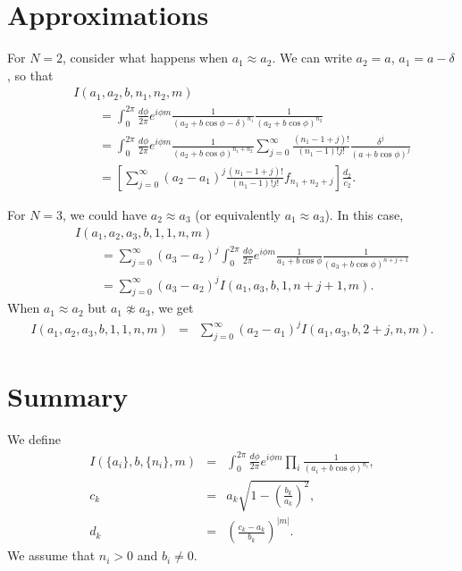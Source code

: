 \documentclass[aps,prc,preprint,tightenlines]{revtex4}
\begin{document}
\section*{Approximations}

For $N=2$, consider what happens when $a_1 \approx a_2$. We can write
$a_2 = a$, $a_1 = a - \delta$, so that
\begin{eqnarray}
&&I(a_1,a_2,b,n_1,n_2,m)\nonumber\\
&&\qquad= \int_0^{2\pi} \frac{d\phi}{2\pi} e^{i \phi m} 
\frac{1}{(a_2 + b \cos\phi - \delta)^{n_1}}
\frac{1}{(a_2 + b \cos\phi)^{n_2}} \\
&&\qquad= \int_0^{2\pi} \frac{d\phi}{2\pi} e^{i \phi m} 
\frac{1}{(a_2 + b \cos\phi)^{n_1+n_2}}
\sum_{j=0}^\infty \frac{(n_1-1+j)!}{(n_1-1)!j!}
\frac{\delta^j}{(a+b\cos\phi)^j} \\
&&\qquad= \left[ \sum_{j=0}^\infty (a_2-a_1)^j \frac{(n_1-1+j)!}{(n_1-1)!j!}
f_{n_1+n_2+j} \right] \frac{d_2}{c_2}.
\end{eqnarray}

For $N=3$, we could have $a_2\approx a_3$ (or equivalently
$a_1\approx a_3$). In this case,
\begin{eqnarray}
&&I(a_1,a_2,a_3,b,1,1,n,m) \nonumber\\
&&\qquad= \sum_{j=0}^\infty (a_3-a_2)^j
\int_0^{2\pi} \frac{d\phi}{2\pi} e^{i \phi m} 
\frac{1}{ a_1 + b \cos\phi}
\frac{1}{(a_3 + b \cos\phi)^{n+j+1}} \\
&&\qquad= \sum_{j=0}^\infty (a_3-a_2)^j I(a_1,a_3,b,1,n+j+1,m).
\end{eqnarray}
When $a_1\approx a_2$ but $a_1\not\approx a_3$, we get
\begin{eqnarray}
I(a_1,a_2,a_3,b,1,1,n,m)
&=& \sum_{j=0}^\infty (a_2-a_1)^j I(a_1,a_3,b,2+j,n,m).
\end{eqnarray}

\section*{Summary}

We define
\begin{eqnarray}
I(\{a_i\},b,\{n_i\},m) &=&
\int_0^{2\pi} \frac{d\phi}{2\pi} e^{i \phi m} 
\prod_i \frac{1}{(a_i+b\cos\phi)^{n_i}}, \\
c_k &=& a_k \sqrt{1-\left(\frac{b_k}{a_k}\right)^2}, \\
d_k &=& \left(\frac{c_k-a_k}{b_k}\right)^{|m|}.
\end{eqnarray}
We assume that $n_i>0$ and $b_i\neq0$.
\end{document}
